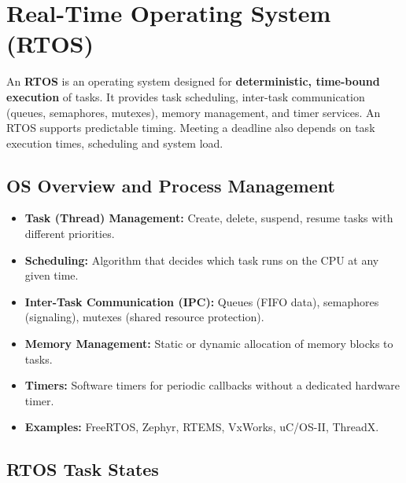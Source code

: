 \documentclass[12pt,a4paper]{article}
\begin{document}
\section{Real-Time Operating System (RTOS)}

\begin{tcolorbox}[defbox, title={\textbf{RTOS --- Real-Time Operating System}}]
An \textbf{RTOS} is an operating system designed for \textbf{deterministic, time-bound execution} of tasks. It provides task scheduling, inter-task communication (queues, semaphores, mutexes), memory management, and timer services. An RTOS supports predictable timing. Meeting a deadline also depends on task execution times, scheduling and system load.
\end{tcolorbox}

\subsection{OS Overview and Process Management}

\begin{tcolorbox}[formulabox, title={\textbf{RTOS Services}}]
\begin{itemize}[leftmargin=*, itemsep=3pt]
  \item \textbf{Task (Thread) Management:} Create, delete, suspend, resume tasks with different priorities.
  \item \textbf{Scheduling:} Algorithm that decides which task runs on the CPU at any given time.
  \item \textbf{Inter-Task Communication (IPC):} Queues (FIFO data), semaphores (signaling), mutexes (shared resource protection).
  \item \textbf{Memory Management:} Static or dynamic allocation of memory blocks to tasks.
  \item \textbf{Timers:} Software timers for periodic callbacks without a dedicated hardware timer.
  \item \textbf{Examples:} FreeRTOS, Zephyr, RTEMS, VxWorks, uC/OS-II, ThreadX.
\end{itemize}
\end{tcolorbox}

\subsection{RTOS Task States}
\end{document}
